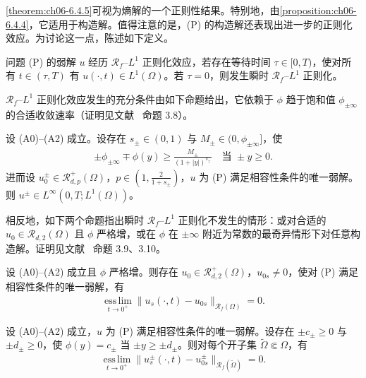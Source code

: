 \documentclass[../../main.tex]{subfiles}%
\begin{document}
\cref{theorem:ch06-6.4.5}可视为熵解的一个正则性结果。特别地，由\cref{proposition:ch06-6.4.4}，它适用于构造解。值得注意的是，(P) 的构造解还表现出进一步的正则化效应。为讨论这一点，陈述如下定义。

\begin{definition}\label{definition:ch06-RfL1正则}
问题 (P) 的弱解 $u$ 经历 $\mathscr{R}_f$--$L^1$ 正则化效应，若存在等待时间 $\tau\in[0,T)$，使对所有 $t\in(\tau,T)$ 有 $u(\cdot,t)\in L^1(\Omega)$。若 $\tau=0$，则发生瞬时 $\mathscr{R}_f$--$L^1$ 正则化。
\end{definition}

$\mathscr{R}_f$--$L^1$ 正则化效应发生的充分条件由如下命题给出，它依赖于 $\phi$ 趋于饱和值 $\phi_{\pm\infty}$ 的合适收敛速率（证明见文献~\cite{ref87} 命题 3.8）。

\begin{proposition}\label{proposition:ch6-瞬时正则}
设 (A0)--(A2) 成立。设存在 $s_\pm\in(0,1)$ 与 $M_\pm\in(0,\phi_{\pm\infty}]$，使
\begin{align}
\pm\phi_{\pm\infty}\mp\phi(y)\geqslant\frac{M_\pm}{(1+|y|)^{s_\pm}}
\quad\text{当 }\pm y\geqslant0. \label{align:ch6-6.38}
\end{align}
进而设 $u^\pm_0\in\mathscr{R}^+_{d,p}(\Omega)$，$p\in(1,\frac{2}{1+s_\pm})$，$u$ 为 (P) 满足相容性条件的唯一弱解。则 $u^\pm\in L^\infty(0,T;L^1(\Omega))$。
\end{proposition}

相反地，如下两个命题指出瞬时 $\mathscr{R}_f$--$L^1$ 正则化不发生的情形：或对合适的 $u_0\in\mathscr{R}_{d,2}(\Omega)$ 且 $\phi$ 严格增，或在 $\phi$ 在 $\pm\infty$ 附近为常数的最奇异情形下对任意构造解。证明见文献~\cite{ref87} 命题 3.9、3.10。

\begin{proposition}\label{proposition:ch06-6.4.7}
设 (A0)--(A2) 成立且 $\phi$ 严格增。则存在 $u_0\in\mathscr{R}^+_{d,2}(\Omega)$，$u_{0s}\neq0$，使对 (P) 满足相容性条件的唯一弱解，有
\begin{align}
\operatorname*{ess\,lim}_{t\to0^+}\|u_s(\cdot,t)-u_{0s}\|_{\mathscr{R}_f(\Omega)}=0. \label{align:ch6-6.39}
\end{align}
\end{proposition}

\begin{proposition}\label{proposition:ch06-6.4.8}
设 (A0)--(A2) 成立，$u$ 为 (P) 满足相容性条件的唯一弱解。设存在 $\pm c_\pm\geqslant0$ 与 $\pm d_\pm\geqslant0$，使 $\phi(y)=c_\pm$ 当 $\pm y\geqslant\pm d_\pm$。则对每个开子集 $\widetilde\Omega\Subset\Omega$，有
\begin{align}
\operatorname*{ess\,lim}_{t\to0^+}\|u^\pm_s(\cdot,t)-u^\pm_{0s}\|_{\mathscr{R}_f(\widetilde\Omega)}=0. \label{align:ch6-6.40}
\end{align}
\end{proposition}
\end{document}
